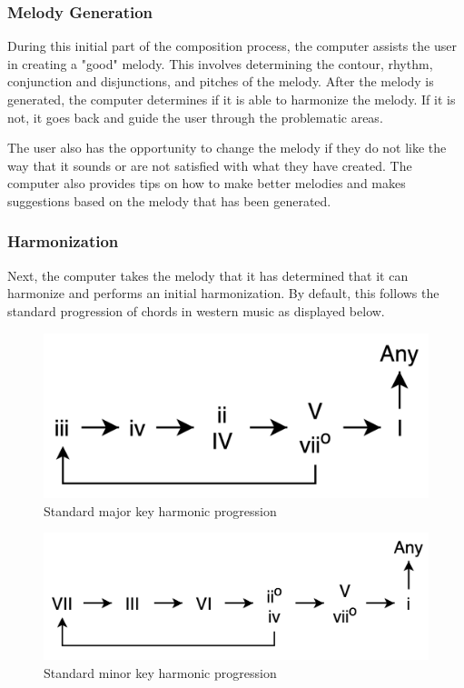 \pagebreak

\subsubsection{Melody Generation}
\label{subsubsec:melody}

During this initial part of the composition process, the computer assists the user in creating a "good" melody.  This involves determining the contour, rhythm, conjunction and disjunctions, and pitches of the melody.  After the melody is generated, the computer determines if it is able to harmonize the melody.  If it is not, it goes back and guide the user through the problematic areas.

\vspace{\baselineskip}

The user also has the opportunity to change the melody if they do not like the way that it sounds or are not satisfied with what they have created.  The computer also provides tips on how to make better melodies and makes suggestions based on the melody that has been generated.

\subsubsection{Harmonization}
\label{subsubsec:harmony}

Next, the computer takes the melody that it has determined that it can harmonize and performs an initial harmonization.  By default, this follows the standard progression of chords in western music as displayed below.

\begin{figure}[h!]
	\centering
	\caption{Standard major key harmonic progression}
	\includegraphics[scale=0.25]{images/majorProgression.png}
\end{figure}

\begin{figure}[h!]
	\centering
	\caption{Standard minor key harmonic progression}
	\includegraphics[scale=0.33]{images/minorProgression.png}
\end{figure}

